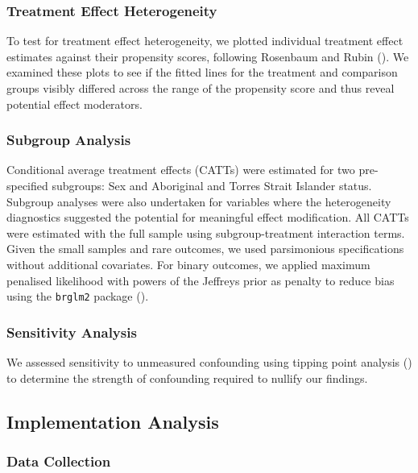 \documentclass[
  jou,
  floatsintext,
  longtable,
  nolmodern,
  notxfonts,
  notimes,
  colorlinks=true,linkcolor=blue,citecolor=blue,urlcolor=blue]{apa7}
\begin{document}
\subsubsection{Treatment Effect
Heterogeneity}\label{treatment-effect-heterogeneity}

To test for treatment effect heterogeneity, we plotted individual
treatment effect estimates against their propensity scores, following
Rosenbaum and Rubin
(). We examined
these plots to see if the fitted lines for the treatment and comparison
groups visibly differed across the range of the propensity score and
thus reveal potential effect moderators.

\subsubsection{Subgroup Analysis}\label{subgroup-analysis}

Conditional average treatment effects (CATTs) were estimated for two
pre-specified subgroups: Sex and Aboriginal and Torres Strait Islander
status. Subgroup analyses were also undertaken for variables where the
heterogeneity diagnostics suggested the potential for meaningful effect
modification. All CATTs were estimated with the full sample using
subgroup-treatment interaction terms. Given the small samples and rare
outcomes, we used parsimonious specifications without additional
covariates. For binary outcomes, we applied maximum penalised likelihood
with powers of the Jeffreys prior as penalty to reduce bias using the
\texttt{brglm2} package
().

\subsubsection{Sensitivity Analysis}\label{sensitivity-analysis}

We assessed sensitivity to unmeasured confounding using tipping point
analysis () to determine the strength of confounding required to nullify our
findings.

\subsection{Implementation Analysis}\label{implementation-analysis}

\subsubsection{Data Collection}\label{data-collection}
\end{document}

